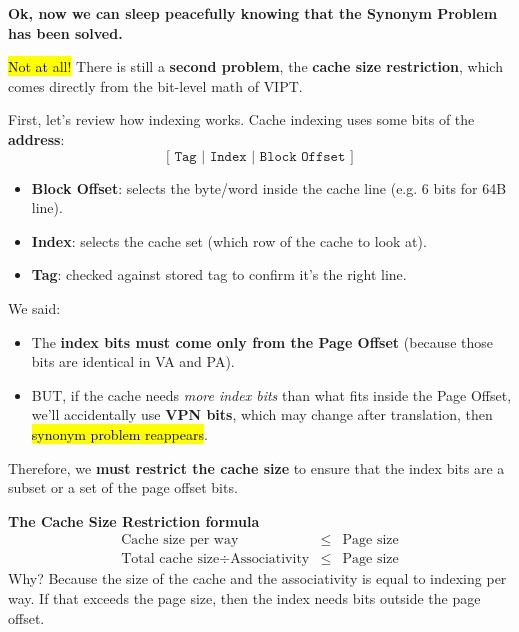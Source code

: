 \highspace
\begin{flushleft}
    \textcolor{Red2}{ \textbf{Ok, now we can sleep peacefully knowing that the Synonym Problem has been solved.}}
\end{flushleft}
\hl{Not at all!} There is still a \textbf{second problem}, the \textbf{cache size restriction}, which comes directly from the bit-level math of VIPT.

\highspace
First, let's review how indexing works. Cache indexing uses some bits of the \textbf{address}:
\begin{equation*}
    \texttt{[ Tag | Index | Block Offset ]}
\end{equation*}
\begin{itemize}
    \item \textbf{Block Offset}: selects the byte/word inside the cache line (e.g. 6 bits for 64B line).
    \item \textbf{Index}: selects the cache set (which row of the cache to look at).
    \item \textbf{Tag}: checked against stored tag to confirm it's the right line.
\end{itemize}
We said:
\begin{itemize}
    \item The \textbf{index bits must come only from the Page Offset} (because those bits are identical in VA and PA).
    \item BUT, if the cache needs \emph{more index bits} than what fits inside the Page Offset, we'll accidentally use \textbf{VPN bits}, which may change after translation, then \hl{synonym problem reappears}.
\end{itemize}
Therefore, we \textbf{must restrict the cache size} to ensure that the index bits are a subset or a set of the page offset bits.

\highspace
\textcolor{Green3}{ \textbf{The Cache Size Restriction formula}}
\begin{equation}
    \begin{array}{rcl}
        \text{Cache size per way} & \leq & \text{Page size} \\ [.3em]
        \text{Total cache size} \div \text{Associativity} & \leq & \text{Page size}
    \end{array}
\end{equation}
Why? Because the size of the cache and the associativity is equal to indexing per way. If that exceeds the page size, then the index needs bits outside the page offset.

